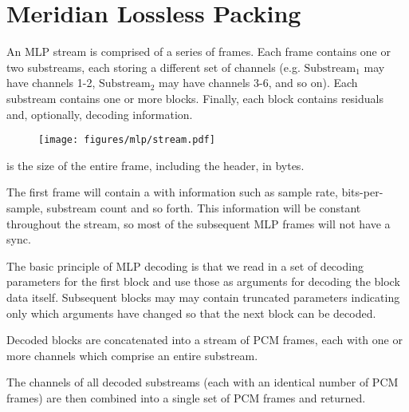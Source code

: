 

\section{Meridian Lossless Packing}

An MLP stream is comprised of a series of frames.
Each frame contains one or two substreams, each storing a different
set of channels (e.g. $\text{Substream}_1$ may have channels 1-2,
$\text{Substream}_2$ may have channels 3-6, and so on).
Each substream contains one or more blocks.
Finally, each block contains  residuals
and, optionally, decoding information.
\begin{figure}[h]
\texttt{[image: figures/mlp/stream.pdf]}
\end{figure}
\par
\noindent
{} is the size of the entire frame,
including the header, in bytes.
\par
The first frame will contain a  with information
such as sample rate, bits-per-sample, substream count and so forth.
This information will be constant throughout the stream,
so most of the subsequent MLP frames will not have a sync.

The basic principle of MLP decoding is that we read in a
set of decoding parameters for the first block and use those
as arguments for decoding the block data itself.
Subsequent blocks may may contain truncated parameters
indicating only which arguments have changed so that the
next block can be decoded.

Decoded blocks are concatenated into a stream of PCM frames,
each with one or more channels which comprise an entire substream.

The channels of all decoded substreams
(each with an identical number of PCM frames) are then combined
into a single set of PCM frames and returned.

\clearpage


